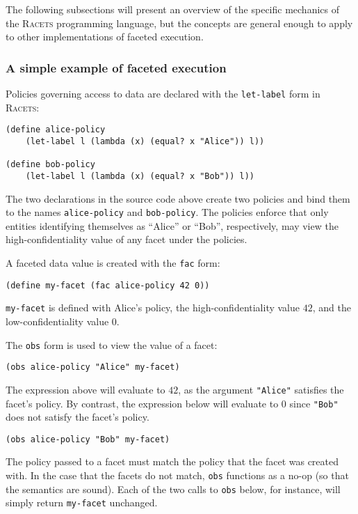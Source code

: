 \documentclass{article}
\begin{document}
The following subsections will present an overview of the specific mechanics of the \textsc{Racets} programming language, but the concepts are general enough to apply to other implementations of faceted execution.

\subsubsection{A simple example of faceted execution}
Policies governing access to data are declared with the \texttt{let-label} form in \textsc{Racets}:

\begin{lstlisting}
(define alice-policy
    (let-label l (lambda (x) (equal? x "Alice")) l))

(define bob-policy
    (let-label l (lambda (x) (equal? x "Bob")) l))
\end{lstlisting}

The two declarations in the source code above create two policies and bind them to the names \texttt{alice-policy} and \texttt{bob-policy}. The policies enforce that only entities identifying themselves as ``Alice'' or ``Bob'', respectively, may view the high-confidentiality value of any facet under the policies.

A faceted data value is created with the \texttt{fac} form:

\begin{lstlisting}
(define my-facet (fac alice-policy 42 0))
\end{lstlisting}

\texttt{my-facet} is defined with Alice's policy, the high-confidentiality value $42$, and the low-confidentiality value $0$.

The \texttt{obs} form is used to view the value of a facet:

\begin{lstlisting}
(obs alice-policy "Alice" my-facet)
\end{lstlisting}

The expression above will evaluate to $42$, as the argument \texttt{"Alice"} satisfies the facet's policy. By contrast, the expression below will evaluate to $0$ since \texttt{"Bob"} does not satisfy the facet's policy.

\begin{lstlisting}
(obs alice-policy "Bob" my-facet)
\end{lstlisting}

The policy passed to a facet must match the policy that the facet was created with. In the case that the facets do not match, \texttt{obs} functions as a no-op (so that the semantics are sound). Each of the two calls to \texttt{obs} below, for instance, will simply return \texttt{my-facet} unchanged.
\end{document}

